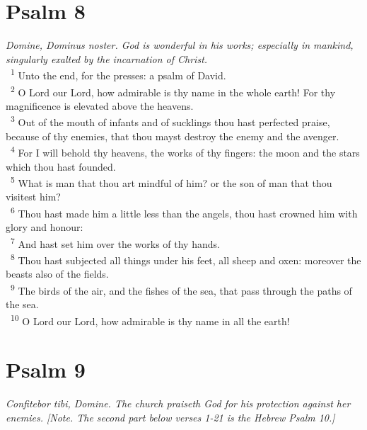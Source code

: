 \documentclass[a5paper,12pt]{article}
\begin{document}
\begin{multicols*}{2}
\section{Psalm 8}
\label{sec:orgc35aedd}
\emph{Domine, Dominus noster. God is wonderful in his works; especially in mankind, singularly exalted by the incarnation of Christ.}\\

~\textsuperscript{1} Unto the end, for the presses: a psalm of David.\\
~\textsuperscript{2} O Lord our Lord, how admirable is thy name in the whole earth! For thy magnificence is elevated above the heavens.\\
~\textsuperscript{3} Out of the mouth of infants and of sucklings thou hast perfected praise, because of thy enemies, that thou mayst destroy the enemy and the avenger.\\
~\textsuperscript{4} For I will behold thy heavens, the works of thy fingers: the moon and the stars which thou hast founded.\\
~\textsuperscript{5} What is man that thou art mindful of him? or the son of man that thou visitest him?\\
~\textsuperscript{6} Thou hast made him a little less than the angels, thou hast crowned him with glory and honour:\\
~\textsuperscript{7} And hast set him over the works of thy hands.\\
~\textsuperscript{8} Thou hast subjected all things under his feet, all sheep and oxen: moreover the beasts also of the fields.\\
~\textsuperscript{9} The birds of the air, and the fishes of the sea, that pass through the paths of the sea.\\
~\textsuperscript{10} O Lord our Lord, how admirable is thy name in all the earth!\\

\section{Psalm 9}
\label{sec:org468874c}
\emph{Confitebor tibi, Domine. The church praiseth God for his protection against her enemies. [Note. The second part below verses 1-21 is the Hebrew Psalm 10.]}\\


\end{multicols*}
\end{document}
